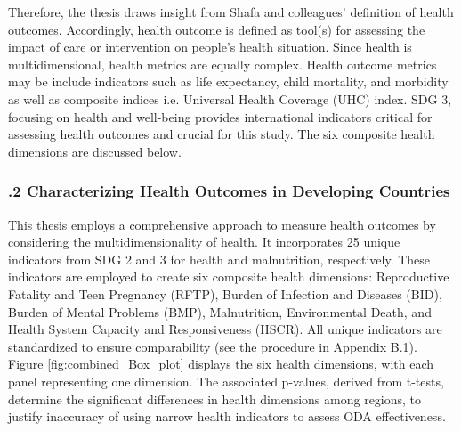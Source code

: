 Therefore, the thesis draws insight from Shafa and colleagues' \parencite{shafa_assessment_2023} definition of health outcomes. Accordingly, health outcome is defined as tool(s) for assessing the impact of care or intervention on people's health situation. Since health is multidimensional, health metrics are equally complex. Health outcome metrics may be include indicators such as life expectancy, child mortality, and morbidity \parencite{shafa_assessment_2023} as well as composite indices i.e. Universal Health Coverage (UHC) index. SDG 3, focusing on health and well-being provides international indicators critical for assessing health outcomes and crucial for this study. The six composite health dimensions are discussed below. 

\subsubsection*{.2 Characterizing Health Outcomes in Developing Countries}
This thesis employs a comprehensive approach to measure health outcomes by considering the multidimensionality of health. It incorporates 25 unique indicators from SDG 2 and 3 for health and malnutrition, respectively. These indicators are employed to create six composite health dimensions: Reproductive Fatality and Teen Pregnancy (RFTP), Burden of Infection and Diseases (BID), Burden of Mental Problems (BMP), Malnutrition, Environmental Death, and Health System Capacity and Responsiveness (HSCR). All unique indicators are standardized to ensure comparability (see the procedure in Appendix B.1). Figure \ref{fig:combined_Box_plot} displays the six health dimensions, with each panel representing one dimension. The associated p-values, derived from t-tests, determine the significant differences in health dimensions among regions, to justify inaccuracy of using narrow health indicators to assess ODA effectiveness.


 
